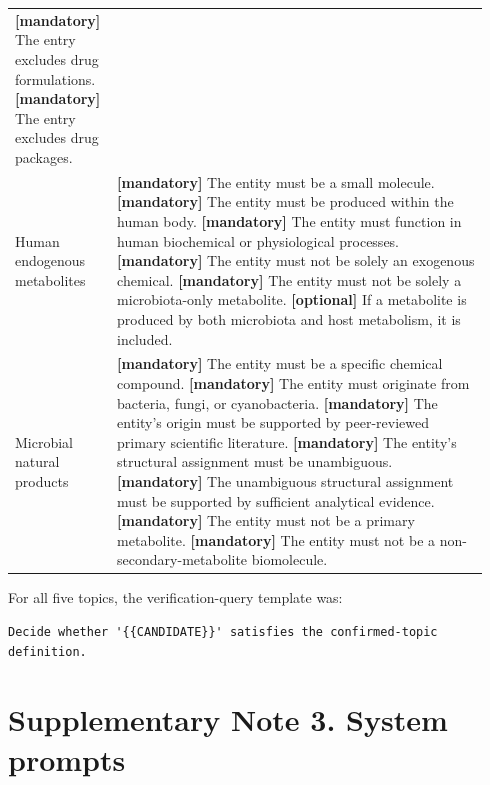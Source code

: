 \documentclass[10pt]{article}
\begin{document}
\begin{longtable}{p{0.18\linewidth}p{0.76\linewidth}}
\textbf{[mandatory]} The entry excludes drug formulations.\newline
\textbf{[mandatory]} The entry excludes drug packages.
\\
Human endogenous metabolites &
\textbf{[mandatory]} The entity must be a small molecule.\newline
\textbf{[mandatory]} The entity must be produced within the human body.\newline
\textbf{[mandatory]} The entity must function in human biochemical or physiological processes.\newline
\textbf{[mandatory]} The entity must not be solely an exogenous chemical.\newline
\textbf{[mandatory]} The entity must not be solely a microbiota-only metabolite.\newline
\textbf{[optional]} If a metabolite is produced by both microbiota and host metabolism, it is included.
\\
Microbial natural products &
\textbf{[mandatory]} The entity must be a specific chemical compound.\newline
\textbf{[mandatory]} The entity must originate from bacteria, fungi, or cyanobacteria.\newline
\textbf{[mandatory]} The entity's origin must be supported by peer-reviewed primary scientific literature.\newline
\textbf{[mandatory]} The entity's structural assignment must be unambiguous.\newline
\textbf{[mandatory]} The unambiguous structural assignment must be supported by sufficient analytical evidence.\newline
\textbf{[mandatory]} The entity must not be a primary metabolite.\newline
\textbf{[mandatory]} The entity must not be a non-secondary-metabolite biomolecule.
\\
\bottomrule
\end{longtable}

For all five topics, the verification-query template was:
\begin{Verbatim}[fontsize=\small,breaklines=true]
Decide whether '{{CANDIDATE}}' satisfies the confirmed-topic definition.
\end{Verbatim}

\section*{Supplementary Note 3. System prompts}
\end{document}
